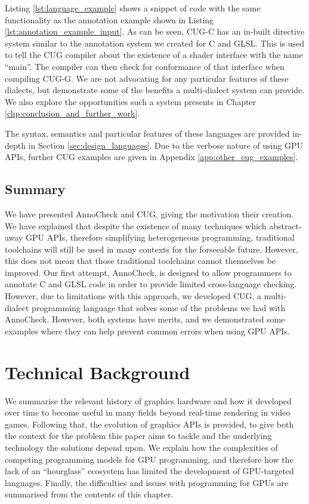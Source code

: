 \documentclass[a4paper,12pt,twoside,openright]{report}
\begin{document}
Listing \ref{lst:language_example} shows a snippet of code with the same
functionality as the annotation example shown in Listing
\ref{lst:annotation_example_input}. As can be seen, CUG-C has an in-built
directive system similar to the annotation system we created for C and GLSL.
This is used to tell the CUG compiler about the existence of a shader interface
with the name ``main''. The compiler can then check for conformance of that
interface when compiling CUG-G. We are not advocating for any particular
features of these dialects, but demonstrate some of the benefits a
multi-dialect system can provide. We also explore the opportunities such a
system presents in Chapter \ref{chp:conclusion_and_further_work}.

The syntax, semantics and particular features of these languages are provided
in-depth in Section \ref{sec:design_languages}. Due to the verbose nature of
using GPU APIs, further CUG examples are given in Appendix
\ref{app:other_cug_examples}.

\section{Summary}

We have presented AnnoCheck and CUG, giving the motivation their creation. We
have explained that despite the existence of many techniques which
abstract-away GPU APIs, therefore simplifying heterogeneous programming,
traditional toolchains will still be used in many contexts for the forseeable
future. However, this does not mean that those traditional toolchains cannot
themselves be improved. Our first attempt, AnnoCheck, is designed to allow
programmers to annotate C and GLSL code in order to provide limited
cross-language checking. However, due to limitations with this approach, we
developed CUG, a multi-dialect programming language that solves some of the
problems we had with AnnoCheck. However, both systems have merits, and we
demonstrated some examples where they can help prevent common errors when using
GPU APIs.

\chapter{Technical Background}

\label{chp:technical_background}

We summarise the relevant history of graphics hardware and how it developed
over time to become useful in many fields beyond real-time rendering in video
games. Following that, the evolution of graphics APIs is provided, to give both
the context for the problem this paper aims to tackle and the underlying
technology the solutions depend upon. We explain how the complexities of
competing programming models for GPU programming, and therefore how the lack of
an ``hourglass'' ecosystem has limited the development of GPU-targeted
languages. Finally, the difficulties and issues with programming for GPUs are
summarised from the contents of this chapter.
\end{document}

